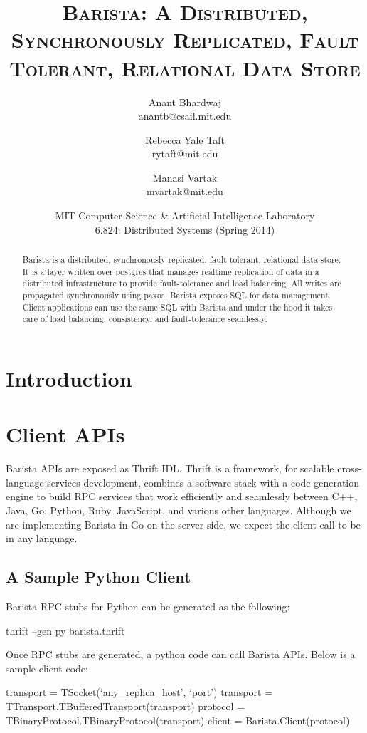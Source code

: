 \documentclass[a4paper]{article}
\title{\textsc{Barista: A Distributed, Synchronously Replicated, Fault Tolerant, Relational Data Store}}
\author{Anant Bhardwaj \\ anantb@csail.mit.edu \and Rebecca Yale Taft \\ rytaft@mit.edu \and Manasi Vartak \\ mvartak@mit.edu}
\date{MIT Computer Science \& Artificial Intelligence Laboratory \\ 6.824: Distributed Systems (Spring 2014)}
\begin{document}
\maketitle
\begin{multicols}{2}
\begin{abstract}
\noindent
Barista is a distributed, synchronously replicated, fault tolerant, relational data store. It is a layer written over postgres that manages realtime replication of data in a distributed infrastructure to provide fault-tolerance and load balancing. All writes are propagated synchronously using paxos. Barista exposes SQL for data management. Client applications can use the same SQL with Barista and under the hood it takes care of load balancing, consistency, and fault-tolerance seamlessly.
\end{abstract}
\section{Introduction}

\section{Client APIs}
\par{
Barista APIs are exposed as Thrift IDL. Thrift is a framework, for scalable cross-language services development, combines a software stack with a code generation engine to build RPC services that work efficiently and seamlessly between C++, Java, Go, Python, Ruby, JavaScript, and various other languages. Although we are implementing Barista in Go on the server side, we expect the client call to be in any language.
}
\subsection{A Sample Python Client}
\par{
Barista RPC stubs for Python can be generated as the following:
\begin{spverbatim}
thrift --gen py barista.thrift

\end{spverbatim}
}
\par{
Once RPC stubs are generated, a python code can call Barista APIs. Below is a sample client code:
}
\par{
\tiny {
\begin{spverbatim}
transport = TSocket(`any_replica_host', `port')
transport = TTransport.TBufferedTransport(transport)
protocol = TBinaryProtocol.TBinaryProtocol(transport)
client = Barista.Client(protocol)


\end{spverbatim}}}
\end{multicols}
\end{document}
